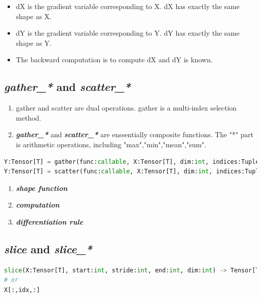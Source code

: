 \begin{itemize}
  \item dX is the gradient variable corresponding to X. dX has exactly the same shape as X.
  \item dY is the gradient variable corresponding to Y. dY has exactly the same shape as Y.
  \item The backward computation is to compute dX and dY is known.
\end{itemize}

\subsection{\textit{\textbf{gather\_*}} and \textbf{\textit{scatter\_*}}}

\begin{enumerate}
  \item gather and scatter are dual operations. gather is a multi-index selection method.
  \item \textit{\textbf{gather\_*}} and \textbf{\textit{scatter\_*}} are enssentially composite functions. The "*" part is arithmetic operations, including "max","min","mean","sum".
\end{enumerate}

\begin{lstlisting}[language=Python]
Y:Tensor[T] = gather(func:callable, X:Tensor[T], dim:int, indices:Tuple[int])
Y:Tensor[T] = scatter(func:callable, X:Tensor[T], dim:int, indices:Tuple[int])
\end{lstlisting}

\begin{enumerate}
  \item \textbf{\textit{shape function}}
  \item \textbf{\textit{computation}}
  \item \textbf{\textit{differentiation rule}}
\end{enumerate}


\subsection{\textit{\textbf{slice}} and \textit{\textbf{slice\_*}}}
\begin{lstlisting}[language=Python]
slice(X:Tensor[T], start:int, stride:int, end:int, dim:int) -> Tensor[T]
# or
X[:,idx,:]
\end{lstlisting}

